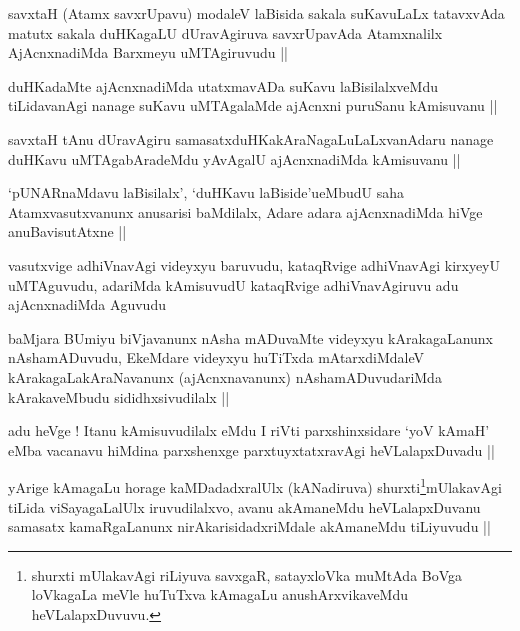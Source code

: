
\begin{artha}
savxtaH (Atamx savxrUpavu) modaleV laBisida sakala suKavuLaLx
tatavxvAda matutx sakala duHKagaLU dUravAgiruva savxrUpavAda
Atamxnalilx AjAcnxnadiMda Barxmeyu uMTAgiruvudu ||
\end{artha}


\begin{artha}
duHKadaMte ajAcnxnadiMda utatxmavADa suKavu laBisilalxveMdu
tiLidavanAgi nanage suKavu uMTAgalaMde ajAcnxni puruSanu kAmisuvanu ||
\end{artha}

\begin{artha}
savxtaH tAnu dUravAgiru samasatxduHKakAraNagaLuLaLxvanAdaru nanage
duHKavu uMTAgabAradeMdu yAvAgalU ajAcnxnadiMda kAmisuvanu ||
\end{artha}

\begin{artha}
`pUNARnaMdavu laBisilalx', `duHKavu laBiside'ueMbudU saha
  Atamxvasutxvanunx anusarisi baMdilalx, Adare adara ajAcnxnadiMda
  hiVge anuBavisutAtxne ||
\end{artha}

\begin{artha}
vasutxvige adhiVnavAgi videyxyu baruvudu, kataqRvige adhiVnavAgi
kirxyeyU uMTAguvudu, adariMda kAmisuvudU kataqRvige adhiVnavAgiruvu
adu ajAcnxnadiMda Aguvudu 
\end{artha}

\begin{artha}
baMjara BUmiyu biVjavanunx nAsha mADuvaMte videyxyu kArakagaLanunx
nAshamADuvudu, EkeMdare videyxyu huTiTxda mAtarxdiMdaleV
kArakagaLakAraNavanunx (ajAcnxnavanunx) nAshamADuvudariMda
kArakaveMbudu sididhxsivudilalx ||
\end{artha}

\begin{artha}
adu heVge ! Itanu kAmisuvudilalx eMdu I riVti parxshinxsidare `yoV\s
kAmaH' eMba vacanavu hiMdina parxshenxge parxtuyxtatxravAgi
heVLalapxDuvadu || 
\end{artha}


\begin{artha}
yArige kAmagaLu horage kaMDadadxralUlx (kANadiruva) shurxti\footnote{shurxti mUlakavAgi riLiyuva savxgaR, satayxloVka muMtAda
  BoVga loVkagaLa meVle huTuTxva kAmagaLu anushArxvikaveMdu
  heVLalapxDuvuvu.}mUlakavAgi tiLida viSayagaLalUlx iruvudilalxvo, avanu akAmaneMdu
heVLalapxDuvanu samasatx kamaRgaLanunx nirAkarisidadxriMdale
akAmaneMdu tiLiyuvudu ||
\end{artha}

